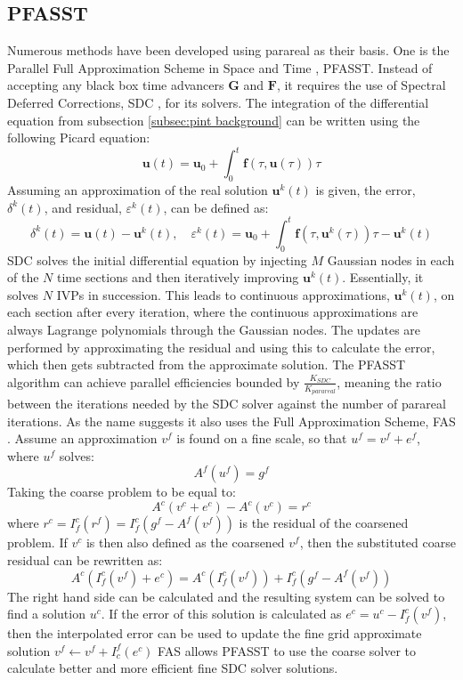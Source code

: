 \subsection{PFASST}
\label{subsec: intro pfasst}
Numerous methods have been developed using parareal as their basis. One is the Parallel Full Approximation Scheme in Space and Time \cite{emmett_toward_2012}, PFASST. Instead of accepting any black box time advancers $\textbf{G}$ and $\textbf{F}$, it requires the use of Spectral Deferred Corrections, SDC \cite{dutt_spectral_2000}, for its solvers. 
\newline
The integration of the differential equation from subsection \ref{subsec:pint background} can be written using the following Picard equation:\[
	\textbf{u}(t) = \textbf{u}_0 + \int^t_0 \textbf{f}(\tau,\textbf{u}(\tau))\tau
\]
Assuming an approximation of the real solution $\textbf{u}^k(t)$ is given, the error, $\delta^k(t)$, and residual, $\varepsilon^k(t)$, can be defined as:\[
	\delta^k(t) = \textbf{u}(t) - \textbf{u}^k(t), \quad
	\varepsilon^k(t) = \textbf{u}_0 + \int^t_0 \textbf{f}(\tau,\textbf{u}^k(\tau))\tau - \textbf{u}^k(t)
\]
SDC solves the initial differential equation by injecting $M$ Gaussian nodes in each of the $N$ time sections and then iteratively improving $\textbf{u}^k(t)$. Essentially, it solves $N$ IVPs in succession. This leads to continuous approximations, $\textbf{u}^{k}(t)$, on each section after every iteration, where the continuous approximations are always Lagrange polynomials through the Gaussian nodes. The updates are performed by approximating the residual and using this to calculate the error, which then gets subtracted from the approximate solution. 
The PFASST algorithm can achieve parallel efficiencies bounded by $\frac{K_{SDC}}{K_{parareal}} $, meaning the ratio between the iterations needed by the SDC solver against the number of parareal iterations. As the name suggests it also uses the Full Approximation Scheme, FAS \cite{brandt_multi-level_1976}.
\newline
Assume an approximation $v^f$ is found on a fine scale, so that $u^f = v^f + e^f$, where $u^f$ solves:
\[A^f(u^f) = g^f\]
Taking the coarse problem to be equal to:
\[A^c(v^c + e^c)  - A^c(v^c) = r^c\]
where $r^c = I_f^c(r^f) = I_f^c(g^f - A^f(v^f))$ is the residual of the coarsened problem. If $v^c$ is then also defined as the coarsened $v^f$, then the substituted coarse residual can be rewritten as:\[
A^c(I_f^c(v^f) + e^c) = A^c(I_f^c(v^f)) + I_f^c(g^f - A^f(v^f))\]
The right hand side can be calculated and the resulting system can be solved to find a solution $u^c$. If the error of this solution is calculated as $e^c = u^c - I_f^c(v^f)$, then the interpolated error can be used to update the fine grid approximate solution $v^f \leftarrow v^f + I_c^f(e^c)$
\cite{henson_multigrid_2003}
\newline
FAS allows PFASST to use the coarse solver to calculate better and more efficient fine SDC solver solutions. 

